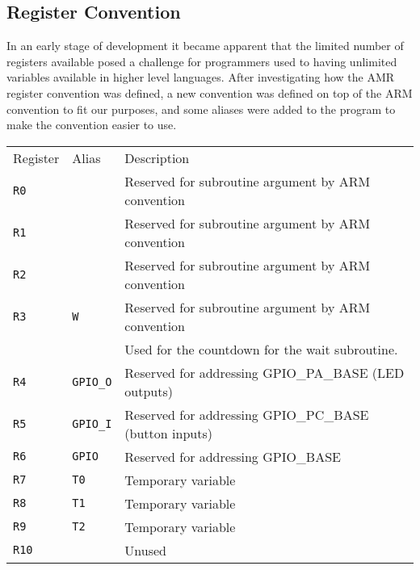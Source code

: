 \subsection{Register Convention}

In an early stage of development it became apparent that the limited number of registers available posed a challenge for programmers used to having unlimited variables available in higher level languages.
After investigating how the AMR register convention was defined, a new convention was defined on top of the ARM convention to fit our purposes, and some aliases were added to the program to make the convention easier to use.

\begin{table}[h!]
    \begin{tabular}{lll}
        Register        & Alias             & Description                                            \\
        \texttt{R0}     & ~                 & Reserved for subroutine argument by ARM convention     \\
        \texttt{R1}     & ~                 & Reserved for subroutine argument by ARM convention     \\
        \texttt{R2}     & ~                 & Reserved for subroutine argument by ARM convention     \\
        \texttt{R3}     & \texttt{W}        & Reserved for subroutine argument by ARM convention     \\
        ~               & ~                 & Used for the countdown for the wait subroutine.        \\
        \texttt{R4}     & \texttt{GPIO\_O}  & Reserved for addressing GPIO\_PA\_BASE (LED outputs)   \\
        \texttt{R5}     & \texttt{GPIO\_I}  & Reserved for addressing GPIO\_PC\_BASE (button inputs) \\
        \texttt{R6}     & \texttt{GPIO}     & Reserved for addressing GPIO\_BASE                     \\
        \texttt{R7}     & \texttt{T0}       & Temporary variable                                     \\
        \texttt{R8}     & \texttt{T1}       & Temporary variable                                     \\
        \texttt{R9}     & \texttt{T2}       & Temporary variable                                     \\
        \texttt{R10}    & ~                 & Unused                                                 \\

\end{tabular}
\end{table}
